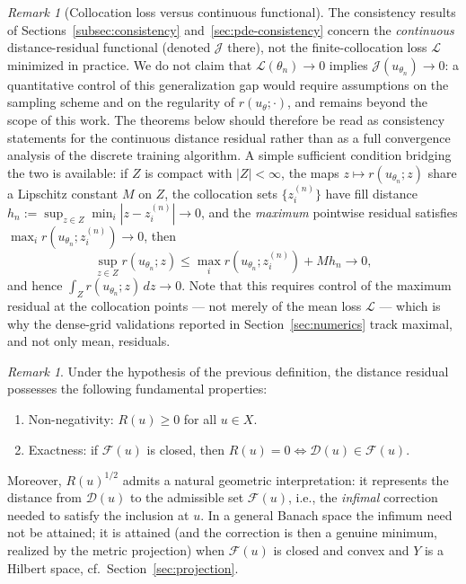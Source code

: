 \documentclass[11pt]{elsarticle}
\theoremstyle{definition}
\theoremstyle{remark}
\newtheorem{remark}[theorem]{Remark}
\numberwithin{equation}{section}
\begin{document}
	\begin{remark}[Collocation loss versus continuous functional]
		\label{rem:collocation-gap}
		The consistency results of
		Sections~\ref{subsec:consistency} and~\ref{sec:pde-consistency}
		concern the \emph{continuous} distance-residual functional (denoted
		$\mathcal{J}$ there), not the finite-collocation loss $\mathcal{L}$
		minimized in practice. We do not claim that
		$\mathcal{L}(\theta_n)\to0$ implies
		$\mathcal{J}(u_{\theta_n})\to0$: a quantitative control of this
		generalization gap would require assumptions on the sampling scheme
		and on the regularity of $r(u_\theta;\cdot)$, and remains beyond the
		scope of this work. The theorems below should therefore be read as
		consistency statements for the continuous distance residual rather
		than as a full convergence analysis of the discrete training
		algorithm. A simple sufficient condition bridging the two is
		available: if $Z$ is compact with $|Z|<\infty$, the maps
		$z\mapsto r(u_{\theta_n};z)$ share a Lipschitz constant $M$ on $Z$,
		the collocation sets $\{z_i^{(n)}\}$ have fill distance
		$h_n:=\sup_{z\in Z}\min_i|z-z_i^{(n)}|\to0$, and the
		\emph{maximum} pointwise residual satisfies
		$\max_i r(u_{\theta_n};z_i^{(n)})\to0$, then
		\[
		\sup_{z\in Z}r(u_{\theta_n};z)
		\le\max_i r(u_{\theta_n};z_i^{(n)})+Mh_n\longrightarrow0,
		\]
		and hence $\int_Z r(u_{\theta_n};z)\,dz\to0$. Note that this
		requires control of the maximum residual at the collocation points
		--- not merely of the mean loss $\mathcal{L}$ --- which is why the
		dense-grid validations reported in Section~\ref{sec:numerics} track
		maximal, and not only mean, residuals.
	\end{remark}
	
	
	
	\begin{remark}
		Under the hypothesis of the previous definition,
		the distance residual possesses the following fundamental properties:
		\begin{enumerate}
			\item Non-negativity: $R(u)\ge 0$ for all $u\in X$.
			\item Exactness: if $\mathcal{F}(u)$ is closed, then
			$R(u)=0 \iff \mathcal{D}(u)\in\mathcal{F}(u)$.
		\end{enumerate}
		Moreover, $R(u)^{1/2}$ admits a natural geometric interpretation: it represents the distance from $\mathcal{D}(u)$ to the admissible set $\mathcal{F}(u)$, i.e., the \emph{infimal} correction needed to satisfy the inclusion at $u$. In a general Banach space the infimum need not be attained; it is attained (and the correction is then a genuine minimum, realized by the metric projection) when $\mathcal{F}(u)$ is closed and convex and $Y$ is a Hilbert space, cf.\ Section~\ref{sec:projection}.
	\end{remark}
	
\end{document}
